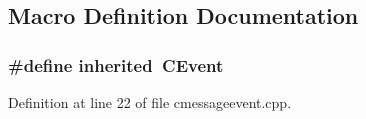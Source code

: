 \subsection{Macro Definition Documentation}
\subsubsection[{inherited}]{\setlength{\rightskip}{0pt plus 5cm}\#define inherited~C\-Event}\label{cmessageevent_8cpp_a3920e3b7cb0909b941b2409493acf8f1}


Definition at line 22 of file cmessageevent.\-cpp.

